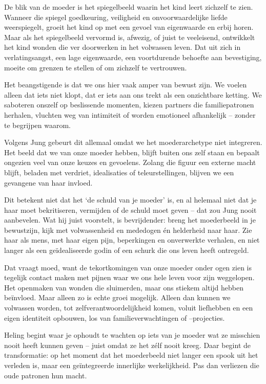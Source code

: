 De blik van de moeder is het spiegelbeeld waarin het kind leert zichzelf te zien. Wanneer die spiegel goedkeuring, veiligheid en onvoorwaardelijke liefde weerspiegelt, groeit het kind op met een gevoel van eigenwaarde en erbij horen. Maar als het spiegelbeeld vervormd is, afwezig, of juist te veeleisend, ontwikkelt het kind wonden die ver doorwerken in het volwassen leven. Dat uit zich in verlatingsangst, een lage eigenwaarde, een voortdurende behoefte aan bevestiging, moeite om grenzen te stellen of om zichzelf te vertrouwen.

Het beangstigende is dat we ons hier vaak amper van bewust zijn. We voelen alleen dat iets niet klopt, dat er iets aan ons trekt als een onzichtbare ketting. We saboteren onszelf op beslissende momenten, kiezen partners die familiepatronen herhalen, vluchten weg van intimiteit of worden emotioneel afhankelijk – zonder te begrijpen waarom.

Volgens Jung gebeurt dit allemaal omdat we het moederarchetype niet integreren. Het beeld dat we van onze moeder hebben, blijft buiten ons zelf staan en bepaalt ongezien veel van onze keuzes en gevoelens. Zolang die figuur een externe macht blijft, beladen met verdriet, idealisaties of teleurstellingen, blijven we een gevangene van haar invloed.

Dit betekent niet dat het ‘de schuld van je moeder’ is, en al helemaal niet dat je haar moet bekritiseren, vermijden of de schuld moet geven – dat zou Jung nooit aanbevelen. Wat hij juist voorstelt, is bevrijdender: breng het moederbeeld in je bewustzijn, kijk met volwassenheid en mededogen én helderheid naar haar. Zie haar als mens, met haar eigen pijn, beperkingen en onverwerkte verhalen, en niet langer als een geïdealiseerde godin of een schurk die ons leven heeft ontregeld.

Dat vraagt moed, want de tekortkomingen van onze moeder onder ogen zien is tegelijk contact maken met pijnen waar we ons hele leven voor zijn weggelopen. Het openmaken van wonden die sluimerden, maar ons stiekem altijd hebben beïnvloed. Maar alleen zo is echte groei mogelijk. Alleen dan kunnen we volwassen worden, tot zelfverantwoordelijkheid komen, voluit liefhebben en een eigen identiteit opbouwen, los van familieverwachtingen of –projecties.

Heling begint waar je ophoudt te wachten op iets van je moeder wat ze misschien nooit heeft kunnen geven – juist omdat ze het zélf nooit kreeg. Daar begint de transformatie: op het moment dat het moederbeeld niet langer een spook uit het verleden is, maar een geïntegreerde innerlijke werkelijkheid. Pas dan verliezen die oude patronen hun macht.

